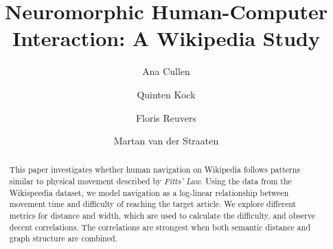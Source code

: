 \documentclass[sigconf]{acmart}
\begin{document}

\title{Neuromorphic Human-Computer Interaction: A Wikipedia Study}

\author{Ana Cullen}

\author{Quinten Kock}


\author{Floris Reuvers}

\author{Martan van der Straaten}



\begin{abstract}
  This paper investigates whether human navigation on Wikipedia follows patterns similar to physical movement described by \emph{Fitts’ Law}.
  Using the data from the Wikispeedia dataset, we model navigation as a log-linear relationship between movement time and difficulty of reaching the target article.
  We explore different metrics for distance and width, which are used to calculate the difficulty, and observe decent correlations. 
   The correlations are strongest when both semantic distance and graph structure are combined.
\end{abstract}
\end{document}
